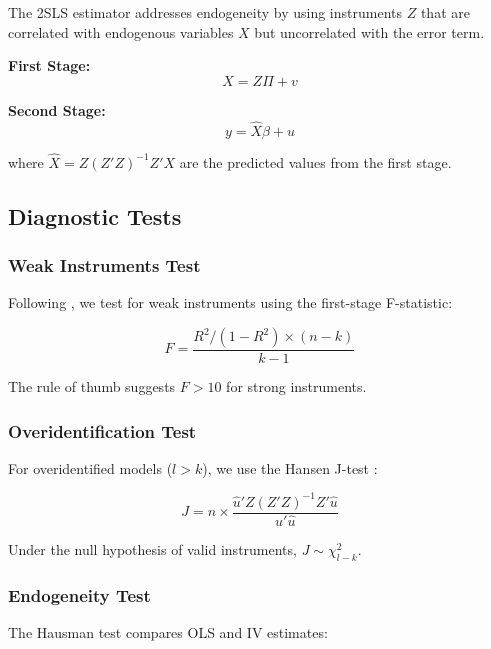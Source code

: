 \documentclass[11pt]{article}
\begin{document}
The 2SLS estimator addresses endogeneity by using instruments $Z$ that are correlated with endogenous variables $X$ but uncorrelated with the error term.

\textbf{First Stage:}
\begin{equation}
X = Z\Pi + v
\end{equation}

\textbf{Second Stage:}
\begin{equation}
y = \hat{X}\beta + u
\end{equation}

where $\hat{X} = Z(Z'Z)^{-1}Z'X$ are the predicted values from the first stage.

\subsection{Diagnostic Tests}

\subsubsection{Weak Instruments Test}

Following \citet{stock2005}, we test for weak instruments using the first-stage F-statistic:

\begin{equation}
F = \frac{R^2/(1-R^2) \times (n-k)}{k-1}
\end{equation}

The rule of thumb suggests $F > 10$ for strong instruments.

\subsubsection{Overidentification Test}

For overidentified models ($l > k$), we use the Hansen J-test \citep{hansen1982}:

\begin{equation}
J = n \times \frac{\hat{u}'Z(Z'Z)^{-1}Z'\hat{u}}{\hat{u}'\hat{u}}
\end{equation}

Under the null hypothesis of valid instruments, $J \sim \chi^2_{l-k}$.

\subsubsection{Endogeneity Test}

The Hausman test \citep{hausman1978} compares OLS and IV estimates:
\end{document}
